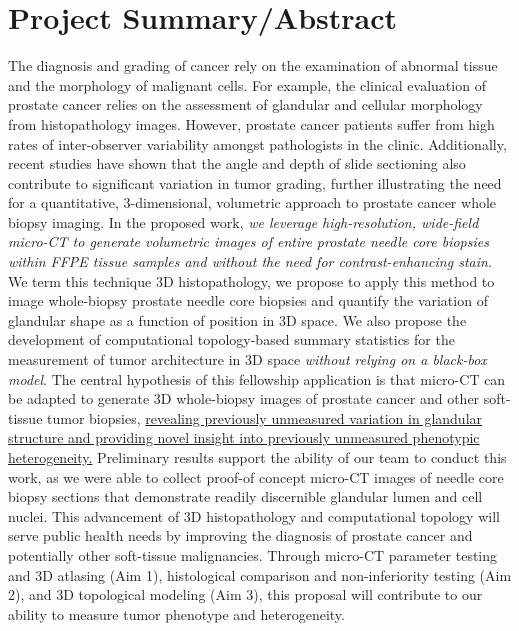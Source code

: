 \documentclass{nihgrant}
\begin{document}
\part*{Project Summary/Abstract}
The diagnosis and grading of cancer rely on the examination of abnormal tissue and the morphology of malignant cells. For example, the clinical evaluation of prostate cancer relies on the assessment of glandular and cellular morphology from histopathology images. However, prostate cancer patients suffer from high rates of inter-observer variability amongst pathologists in the clinic. Additionally, recent studies have shown that the angle and depth of slide sectioning also contribute to significant variation in tumor grading, further illustrating the need for a quantitative, 3-dimensional, volumetric approach to prostate cancer whole biopsy imaging. In the proposed work, \emph{we leverage high-resolution, wide-field micro-CT to generate volumetric images of entire prostate needle core biopsies within FFPE tissue samples and without the need for contrast-enhancing stain.} We term this technique 3D histopathology, we propose to apply this method to image whole-biopsy prostate needle core biopsies and quantify the variation of glandular shape as a function of position in 3D space. We also propose the development of computational topology-based summary statistics for the measurement of tumor architecture in 3D space \textit{without relying on a black-box model}. The central hypothesis of this fellowship application is that micro-CT can be adapted to generate 3D whole-biopsy images of prostate cancer and other soft-tissue tumor biopsies, \uline{revealing previously unmeasured variation in glandular structure and providing novel insight into previously unmeasured phenotypic heterogeneity.} Preliminary results support the ability of our team to conduct this work, as we were able to collect proof-of concept micro-CT images of needle core biopsy sections that demonstrate readily discernible glandular lumen and cell nuclei. This advancement of 3D histopathology and computational topology will serve public health needs by improving the diagnosis of prostate cancer and potentially other soft-tissue malignancies. Through micro-CT parameter testing and 3D atlasing (Aim 1), histological comparison and non-inferiority testing (Aim 2), and 3D topological modeling (Aim 3), this proposal will contribute to our ability to measure tumor phenotype and heterogeneity.


\end{document}
